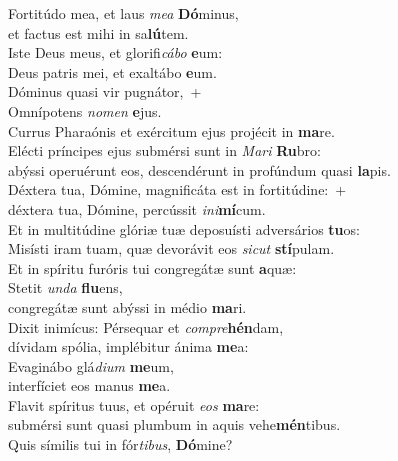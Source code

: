 \evenverse Fortitúdo mea, et laus \textit{me}\textit{a} \textbf{Dó}minus,~\*\\
\evenverse et factus est mihi in sa\textbf{lú}tem.\\
\oddverse Iste Deus meus, et glorifi\textit{cá}\textit{bo} \textbf{e}um:~\*\\
\oddverse Deus patris mei, et exaltábo \textbf{e}um.\\
\evenverse Dóminus quasi vir pugnátor,~+\\
\evenverse  Omnípotens \textit{no}\textit{men} \textbf{e}jus.~\*\\
\evenverse Currus Pharaónis et exércitum ejus projécit in \textbf{ma}re.\\
\oddverse Elécti príncipes ejus submérsi sunt in \textit{Ma}\textit{ri} \textbf{Ru}bro:~\*\\
\oddverse abýssi operuérunt eos, descendérunt in profúndum quasi \textbf{la}pis.\\
\evenverse Déxtera tua, Dómine, magnificáta est in fortitúdine:~+\\
\evenverse  déxtera tua, Dómine, percússit \textit{i}\textit{ni}\textbf{mí}cum.~\*\\
\evenverse Et in multitúdine glóriæ tuæ deposuísti adversários \textbf{tu}os:\\
\oddverse Misísti iram tuam, quæ devorávit eos \textit{si}\textit{cut} \textbf{stí}pulam.~\*\\
\oddverse Et in spíritu furóris tui congregátæ sunt \textbf{a}quæ:\\
\evenverse Stetit \textit{un}\textit{da} \textbf{flu}ens,~\*\\
\evenverse congregátæ sunt abýssi in médio \textbf{ma}ri.\\
\oddverse Dixit inimícus: Pérsequar et \textit{com}\textit{pre}\textbf{hén}dam,~\*\\
\oddverse dívidam spólia, implébitur ánima \textbf{me}a:\\
\evenverse Evaginábo glá\textit{di}\textit{um} \textbf{me}um,~\*\\
\evenverse interfíciet eos manus \textbf{me}a.\\
\oddverse Flavit spíritus tuus, et opéruit \textit{e}\textit{os} \textbf{ma}re:~\*\\
\oddverse submérsi sunt quasi plumbum in aquis vehe\textbf{mén}tibus.\\
\evenverse Quis símilis tui in fór\textit{ti}\textit{bus}, \textbf{Dó}mine?~\*\\
